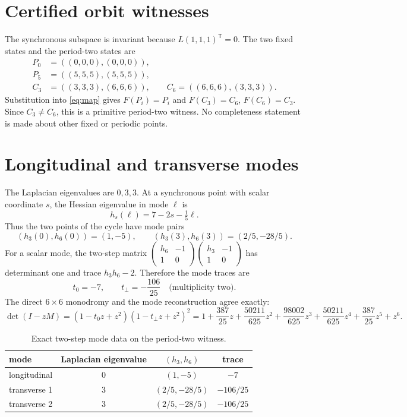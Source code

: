 \documentclass[10pt]{article}
\begin{document}
\section{Certified orbit witnesses}
The synchronous subspace is invariant because $L(1,1,1)^\mathsf{T}=0$.
The two fixed states and the period-two states are
\[
\begin{aligned}
 P_0&=((0,0,0),(0,0,0)),\\
 P_5&=((5,5,5),(5,5,5)),\\
 C_3&=((3,3,3),(6,6,6)),\qquad
 C_6=((6,6,6),(3,3,3)).
\end{aligned}
\]
Substitution into \eqref{eq:map} gives $F(P_i)=P_i$ and
$F(C_3)=C_6$, $F(C_6)=C_3$. Since $C_3\ne C_6$, this is a primitive
period-two witness. No completeness statement is made about other fixed or
periodic points.

\section{Longitudinal and transverse modes}
The Laplacian eigenvalues are $0,3,3$. At a synchronous point with scalar
coordinate $s$, the Hessian eigenvalue in mode $\ell$ is
\[
 h_s(\ell)=7-2s-\tfrac15\ell .
\]
Thus the two points of the cycle have mode pairs
\[
 (h_3(0),h_6(0))=(1,-5),\qquad
 (h_3(3),h_6(3))=(2/5,-28/5).
\]
For a scalar mode, the two-step matrix
$\left(\begin{smallmatrix}h_6&-1\\1&0\end{smallmatrix}\right)
\left(\begin{smallmatrix}h_3&-1\\1&0\end{smallmatrix}\right)$ has determinant one
and trace $h_3h_6-2$. Therefore the mode traces are
\[
 t_0=-7,\qquad t_\perp=-\frac{106}{25}
 \quad\text{(multiplicity two)}.
\]
The direct $6\times6$ monodromy and the mode reconstruction agree exactly:
\begin{equation}
 \det(I-zM)=(1-t_0z+z^2)(1-t_\perp z+z^2)^2
 =1+\frac{387}{25}z+\frac{50211}{625}z^2
 +\frac{98002}{625}z^3+\frac{50211}{625}z^4
 +\frac{387}{25}z^5+z^6 .
 \label{eq:poly}
\end{equation}

\begin{table}[t]
\centering
\caption{Exact two-step mode data on the period-two witness.}
\begin{tabular}{@{}lccc@{}}
\toprule
mode & Laplacian eigenvalue & $(h_3,h_6)$ & trace \\
\midrule
longitudinal & $0$ & $(1,-5)$ & $-7$\\
transverse 1 & $3$ & $(2/5,-28/5)$ & $-106/25$\\
transverse 2 & $3$ & $(2/5,-28/5)$ & $-106/25$\\
\bottomrule
\end{tabular}
\end{table}
\end{document}

